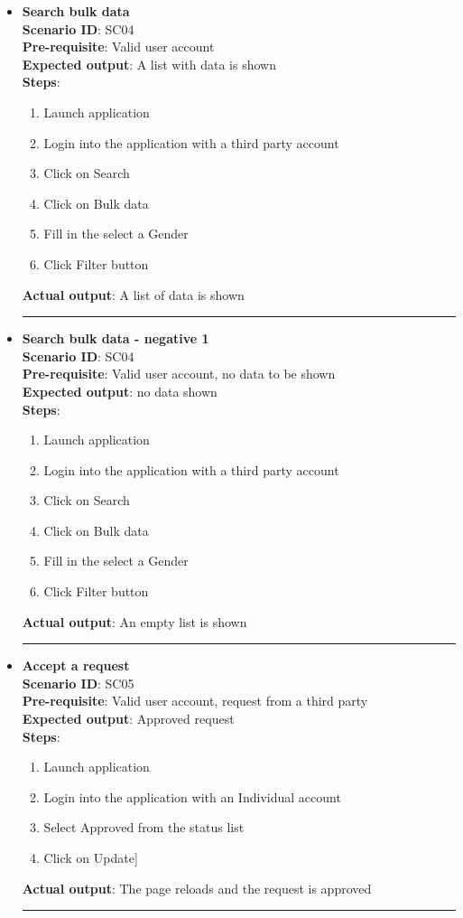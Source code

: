 \documentclass[a4paper, hidelinks, 12pt]{report}
\begin{document}
\begin{itemize}
		\item{\textbf{Search bulk data}} \\
		\textbf{Scenario ID}: SC04 \\
		\textbf{Pre-requisite}: Valid user account \\
		\textbf{Expected output}: A list with data is shown\\
		\textbf{Steps}:
		\begin{enumerate}
			\item{Launch application}
			\item{Login into the application with a third party account}
			\item{Click on Search}
			\item{Click on Bulk data}
			\item{Fill in the select a Gender}
			\item{Click Filter button}
		\end{enumerate}
		\textbf{Actual output}: A list of data is shown\\
		\rule{\linewidth}{0.4pt}
		
		\item{\textbf{Search bulk data - negative 1}} \\
		\textbf{Scenario ID}: SC04 \\
		\textbf{Pre-requisite}: Valid user account, no data to be shown \\
		\textbf{Expected output}: no data shown\\
		\textbf{Steps}:
		\begin{enumerate}
			\item{Launch application}
			\item{Login into the application with a third party account}
			\item{Click on Search}
			\item{Click on Bulk data}
			\item{Fill in the select a Gender}
			\item{Click Filter button}
		\end{enumerate}
		\textbf{Actual output}: An empty list is shown\\
		\rule{\linewidth}{0.4pt}
		
		\item{\textbf{Accept a request}} \\
		\textbf{Scenario ID}: SC05 \\
		\textbf{Pre-requisite}: Valid user account,  request from a third party \\
		\textbf{Expected output}: Approved request\\
		\textbf{Steps}:
		\begin{enumerate}
			\item{Launch application}
			\item{Login into the application with an Individual account}
			\item{Select Approved from the status list}
			\item{Click on Update}]
		\end{enumerate}
		\textbf{Actual output}: The page reloads and the request is approved\\
		\rule{\linewidth}{0.4pt}
		

\end{itemize}
\end{document}
